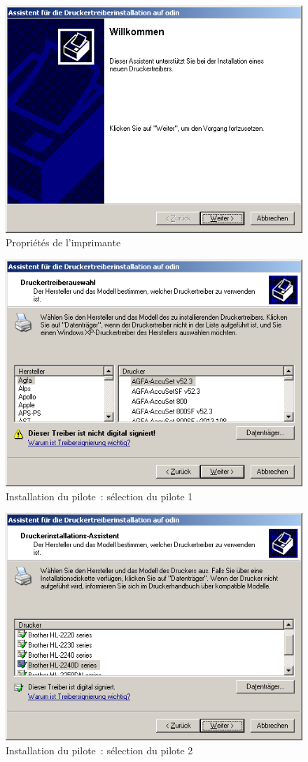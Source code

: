 \begin{figure}[hbt!]
\centering
\includegraphics[width=\columnwidth]{image010}
\caption{Propriétés de l'imprimante}
\label{fig:sambalpd:setup-start}
\end{figure}

\begin{figure}[hbt!]
\centering
\includegraphics[width=0.7\columnwidth]{image011}
\caption{Installation du pilote~: sélection du pilote 1}
\label{fig:sambalpd:setup-choose-driver:1}
\end{figure}

\begin{figure}[hbt!]
\centering
\includegraphics[width=0.7\columnwidth]{image012}
\caption{Installation du pilote~: sélection du pilote 2}
\label{fig:sambalpd:setup-choose-driver:2}
\end{figure}

